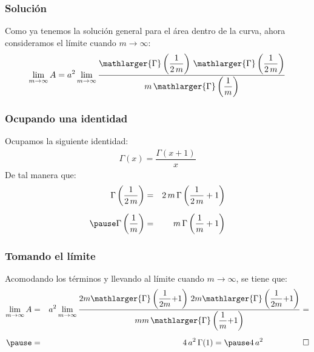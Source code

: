 \documentclass[12pt]{beamer}
\begin{document}
\begin{frame}
\frametitle{Solución}
Como ya tenemos la solución general para el área dentro de la curva, ahora consideramos el límite cuando $m \to \infty$:
\begin{align*}
\lim_{m \to \infty} A = a^{2} \lim_{m \to \infty} \dfrac{\mathlarger{\Gamma} \left( \dfrac{1}{2 \, m} \right) \, \mathlarger{\Gamma} \left( \dfrac{1}{2 \, m} \right)}{m \, \mathlarger{\Gamma} \left( \dfrac{1}{m} \right)}
\end{align*}
\end{frame}
\begin{frame}
\frametitle{Ocupando una identidad}
Ocupamos la siguiente identidad:
\begin{align*}
\Gamma (x) = \dfrac{\Gamma (x + 1)}{x}
\end{align*}
De tal manera que:
\begin{eqnarray*}
\Gamma \left( \dfrac{1}{2 \, m} \right) &=& 2 \, m \, \Gamma \left( \dfrac{1}{2 \, m} + 1 \right) \\[0.5em] \pause
\Gamma \left( \dfrac{1}{m} \right) &=& m \, \Gamma \left( \dfrac{1}{m} + 1 \right)
\end{eqnarray*}
\end{frame}
\begin{frame}
\frametitle{Tomando el límite}
Acomodando los términos y llevando al límite cuando $m \to \infty$, se tiene que:
\begin{eqnarray*}
\lim_{m \to \infty} A &=& a^{2} \lim_{m \to \infty} \dfrac{2 m \mathlarger{\Gamma} \left( \dfrac{1}{2m} {+} 1 \right) \, 2 m \mathlarger{\Gamma} \left( \dfrac{1}{2m} {+} 1 \right)}{m m \, \mathlarger{\Gamma} \left( \dfrac{1}{m} {+} 1 \right)} = \\[0.5em] \pause 
&=& 4 \, a^{2} \, \Gamma(1) = \pause 4 \, a^{2} \hspace{1cm} \qed
\end{eqnarray*}
\end{frame}
  
\end{document}
